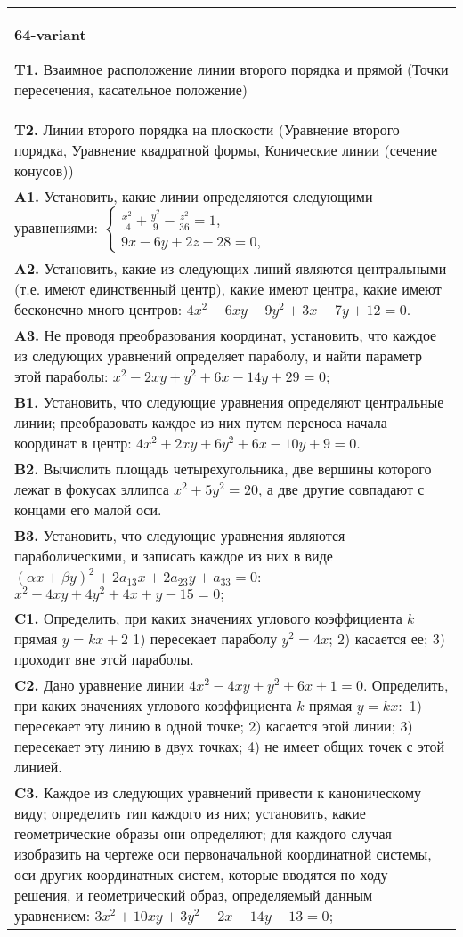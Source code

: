 \documentclass{article}
\begin{document}
\begin{tabular}{m{17cm}}
\textbf{64-variant}
\newline

\textbf{T1.} Взаимное расположение линии второго порядка и прямой (Точки пересечения, касательное положение) \\
\textbf{T2.} Линии второго порядка на плоскости (Уравнение второго порядка, Уравнение квадратной формы, Конические линии (сечение конусов)) \\
\textbf{A1.} Установить, какие линии определяются следующими уравнениями: $\left\{\begin{array}{l}\frac{x^2}{.4}+\frac{y^2}{9}-\frac{z^2}{36}=1, \\ 9 x-6 y+2 z-28=0,\end{array}\right.$ \\
\textbf{A2.} Установить, какие из следующих линий являются центральными (т.е. имеют единственный центр), какие имеют центра, какие имеют бесконечно много центров: $4 x^2-6 x y-9 y^2+3 x-7 y+12=0$. \\
\textbf{A3.} Не проводя преобразования координат, установить, что каждое из следующих уравнений определяет параболу, и найти параметр этой параболы: $x^2-2 x y+y^2+6 x-14 y+29=0$; \\
\textbf{B1.} Установить, что следующие уравнения определяют центральные линии; преобразовать каждое из них путем переноса начала координат в центр: $4 x^2+2 x y+6 y^2+6 x-10 y+9=0$. \\
\textbf{B2.} Вычислить площадь четырехугольника, две вершины которого лежат в фокусах эллипса $x^2+5 y^2=20$, а две другие совпадают с концами его малой оси. \\
\textbf{B3.} Установить, что следующие уравнения являются параболическими, и записать каждое из них в виде $(\alpha x+\beta y)^2+2 a_{13} x+2 a_{23} y+a_{33}=0$: $x^2+4 x y+4 y^2+4 x+y-15=0 ;$ \\
\textbf{C1.} Определить, при каких значениях углового коэффициента $k$ прямая $y=k x+2$ 1) пересекает параболу $y^2=4 x$; 2) касается ее; 3) проходит вне этсй параболы. \\
\textbf{C2.} Дано уравнение линии $4 x^2-4 x y+y^2+6 x+1=0$. Определить, при каких значениях углового коэффициента $k$ прямая $y=k x:$ 1) пересекает эту линию в одной точке; 2) касается этой линии; 3) пересекает эту линию в двух точках; 4) не имеет общих точек с этой линией. \\
\textbf{C3.} Каждое из следующих уравнений привести к каноническому виду; определить тип каждого из них; установить, какие геометрические образы они определяют; для каждого случая изобразить на чертеже оси первоначальной координатной системы, оси других координатных систем, которые вводятся по ходу решения, и геометрический образ, определяемый данным уравнением: $3 x^2+10 x y+3 y^2-2 x-14 y-13=0$; \\

\end{tabular}
\vspace{1cm}
\end{document}
